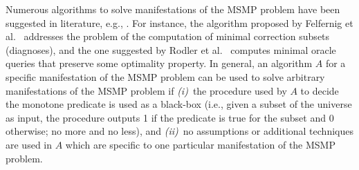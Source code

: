 \documentclass[]{elsarticle}
\begin{document}
	Numerous algorithms to solve manifestations of the MSMP problem have been suggested in literature, e.g.,  \cite{bradley2007checking,marques2013minimal,Rodler2015phd,junker01,junker04,bradley2008property,DBLP:journals/corr/Rodler2017,Shchekotykhin2014,shchekotykhin2015mergexplain,felfernig2012efficient,belov2012muser2}.
	For instance, the algorithm proposed by 
	Felfernig et al.\ \cite{felfernig2012efficient} addresses the problem of the computation of minimal correction subsets (diagnoses), 
	and the one suggested by Rodler et al.\ \cite{DBLP:journals/corr/Rodler2017} computes minimal oracle queries that preserve some optimality property. In general,
	an algorithm $A$ for a specific manifestation of the MSMP problem can be used to solve arbitrary manifestations of the MSMP problem if 
	\emph{(i)}~the procedure used by $A$ to decide the monotone predicate is used as a black-box (i.e., given a subset of the universe as input, the procedure outputs 1 if the predicate is true for the subset and 0 otherwise; no more and no less), and 
	\emph{(ii)}~no assumptions or additional techniques are used in $A$ which are specific to one particular manifestation of the MSMP problem. 
	
\end{document}
